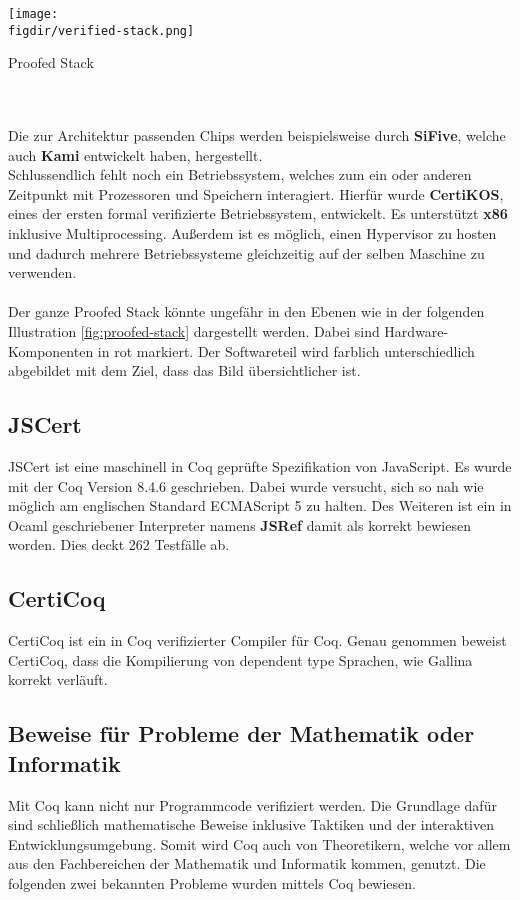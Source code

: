 \begin{minipage}{\textwidth}
	\centering
	\captionsetup{type=figure}
	\texttt{[image: \\figdir/verified-stack.png]}
	\caption{Proofed Stack}
	\label{fig:proofed-stack}
\end{minipage}
\\
\\
Die zur Architektur passenden Chips werden beispielsweise durch \textbf{SiFive}, welche auch \textbf{Kami} entwickelt haben, hergestellt.\\
Schlussendlich fehlt noch ein Betriebssystem, welches zum ein oder anderen Zeitpunkt mit Prozessoren und Speichern interagiert. Hierfür wurde \textbf{CertiKOS}, eines der ersten formal verifizierte Betriebssystem, entwickelt. Es unterstützt \textbf{x86} inklusive Multiprocessing. Außerdem ist es möglich, einen Hypervisor zu hosten und dadurch mehrere Betriebssysteme gleichzeitig auf der selben Maschine zu verwenden.\cite{CERTIKOS01:FV}\cite{CERTIKOS02:FV}\\
\\
Der ganze Proofed Stack könnte ungefähr in den Ebenen wie in der folgenden Illustration \ref{fig:proofed-stack} dargestellt werden. Dabei sind Hardware-Komponenten in rot markiert. Der Softwareteil wird farblich unterschiedlich abgebildet mit dem Ziel, dass das Bild übersichtlicher ist.


\subsection{JSCert}
JSCert ist eine maschinell in Coq geprüfte Spezifikation von JavaScript. Es wurde mit der Coq Version 8.4.6 geschrieben. Dabei wurde versucht, sich so nah wie möglich am englischen Standard ECMAScript 5 zu halten. Des Weiteren ist ein in Ocaml geschriebener Interpreter namens \textbf{JSRef} damit als korrekt bewiesen worden. Dies deckt 262 Testfälle ab.\cite{JSCERT01:FV}\cite{JSCERT012:FV}

\subsection{CertiCoq}
CertiCoq ist ein in Coq verifizierter Compiler für Coq. Genau genommen beweist CertiCoq, dass die Kompilierung von dependent type Sprachen, wie Gallina korrekt verläuft.\cite{CERTICOQ01:FV}\cite{CERTICOQ02:FV}

\subsection{Beweise für Probleme der Mathematik oder Informatik}
Mit Coq kann nicht nur Programmcode verifiziert werden. Die Grundlage dafür sind schließlich mathematische Beweise inklusive Taktiken und der interaktiven Entwicklungsumgebung. Somit wird Coq auch von Theoretikern, welche vor allem aus den Fachbereichen der Mathematik und Informatik kommen, genutzt. Die folgenden zwei bekannten Probleme wurden mittels Coq bewiesen. 

